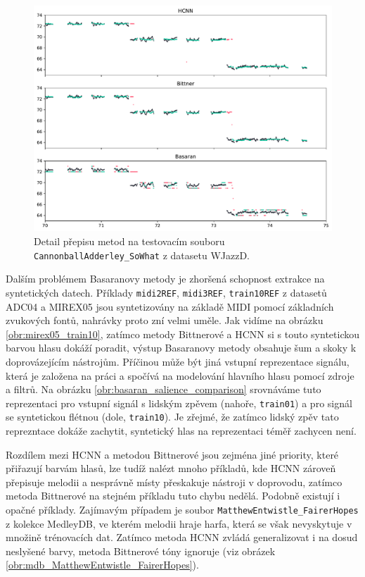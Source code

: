 \begin{figure}[h]\centering
\includegraphics[width=\textwidth,height=\textheight,keepaspectratio]{../img/vysledky/wjazzd_CannonballAdderley_SoWh}
\caption{Detail přepisu metod na testovacím souboru \texttt{CannonballAdderley\_SoWhat} z datasetu WJazzD.}
\label{obr:wjazzd_CannonballAdderley_SoWhat_detail}
\end{figure}


Dalším problémem Basaranovy metody je zhoršená schopnost extrakce na syntetických datech. Příklady \texttt{midi2REF}, \texttt{midi3REF}, \texttt{train10REF} z datasetů ADC04 a MIREX05 jsou syntetizovány na základě MIDI pomocí základních zvukových fontů, nahrávky proto zní velmi uměle. Jak vidíme na obrázku \ref{obr:mirex05_train10}, zatímco metody Bittnerové a HCNN si s touto syntetickou barvou hlasu dokáží poradit, výstup Basaranovy metody obsahuje šum a skoky k doprovázejícím nástrojům. Příčinou může být jiná vstupní reprezentace signálu, která je založena na práci \cite{Durrieu2010} a spočívá na modelování hlavního hlasu pomocí zdroje a filtrů. Na obrázku \ref{obr:basaran_salience_comparison} srovnáváme tuto reprezentaci pro vstupní signál s lidským zpěvem (nahoře, \texttt{train01}) a pro signál se syntetickou flétnou (dole, \texttt{train10}). Je zřejmé, že zatímco lidský zpěv tato reprezntace dokáže zachytit, syntetický hlas na reprezentaci téměř zachycen není. 

Rozdílem mezi HCNN a metodou Bittnerové jsou zejména jiné priority, které přiřazují barvám hlasů, lze tudíž nalézt mnoho příkladů, kde HCNN zároveň přepisuje melodii a nesprávně místy přeskakuje nástroji v doprovodu, zatímco metoda Bittnerové na stejném příkladu tuto chybu nedělá. Podobně existují i opačné příklady. Zajímavým případem je soubor \texttt{MatthewEntwistle\_FairerHopes} z kolekce MedleyDB, ve kterém melodii hraje harfa, která se však nevyskytuje v množině trénovacích dat. Zatímco metoda HCNN zvládá generalizovat i na dosud neslyšené barvy, metoda Bittnerové tóny ignoruje (viz obrázek \ref{obr:mdb_MatthewEntwistle_FairerHopes}).


